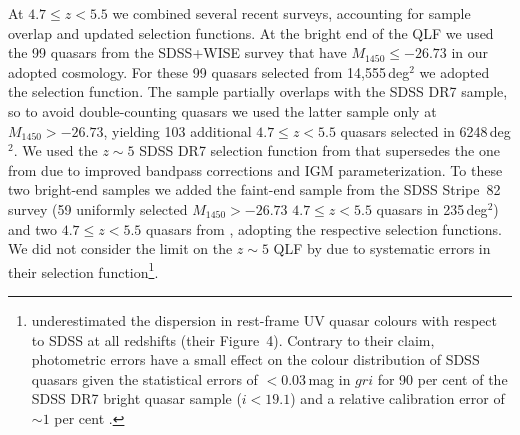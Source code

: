 \documentclass[fleqn,usenatbib]{mnras}
\begin{document}
At $4.7\le z<5.5$ we combined several recent surveys, accounting for
sample overlap and updated selection functions. At the bright end of
the QLF we used the 99 quasars from the SDSS+WISE survey
\citep{2016ApJ...829...33Y} that have $M_{1450}\le -26.73$ in our
adopted cosmology.  For these 99 quasars selected from 14,555\,deg$^2$
we adopted the \citet{2016ApJ...829...33Y} selection function.  The
\citet{2016ApJ...829...33Y} sample partially overlaps with the
\citet{2013ApJ...768..105M} SDSS DR7 sample, so to avoid
double-counting quasars we used the latter sample only at
$M_{1450}>-26.73$, yielding 103 additional $4.7\le z<5.5$ quasars
selected in 6248\,deg$^2$. We used the $z\sim 5$ SDSS DR7 selection
function from \citet{2013ApJ...768..105M} that supersedes the one from
\citet{2006AJ....131.2766R} due to improved bandpass corrections and
IGM parameterization.  To these two bright-end samples we added the
faint-end sample from the \citet{2013ApJ...768..105M} SDSS Stripe~82
survey (59 uniformly selected $M_{1450}>-26.73$ $4.7\le z<5.5$ quasars
in 235\,deg$^2$) and two $4.7\le z<5.5$ quasars from
\citet{2011ApJ...728L..26G}, adopting the respective selection
functions.  We did not consider the limit on the $z\sim 5$ QLF by
\citet{2012ApJ...756..160I} due to systematic errors in their
selection function\footnote{\citet{2012ApJ...756..160I} underestimated
  the dispersion in rest-frame UV quasar colours with respect to SDSS
  at all redshifts (their Figure~4). Contrary to their claim,
  photometric errors have a small effect on the colour distribution of
  SDSS quasars given the statistical errors of $<0.03$\,mag in $gri$
  for 90 per cent of the SDSS DR7 bright quasar sample ($i<19.1$) and
  a relative calibration error of $\sim 1$ per cent
  \citep{2008ApJ...674.1217P}.}.
\end{document}

